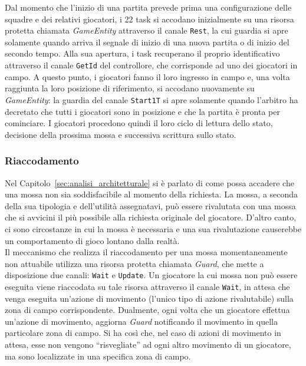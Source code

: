 Dal momento che l'inizio di una partita prevede prima una configurazione delle squadre e dei relativi giocatori, i 22 task si accodano inizialmente su una risorsa protetta chiamata \emph{GameEntity} attraverso il canale \verb+Rest+, la cui guardia si apre solamente quando arriva il segnale di inizio di una nuova partita o di inizio del secondo tempo. Alla sua apertura, i task recuperano il proprio identificativo attraverso il canale \verb+GetId+ del controllore, che corrisponde ad uno dei giocatori in campo. A questo punto, i giocatori fanno il loro ingresso in campo e, una volta raggiunta la loro posizione di riferimento, si accodano nuovamente su \emph{GameEntity}: la guardia del canale \verb+Start1T+ si apre solamente quando l'arbitro ha decretato che tutti i giocatori sono in posizione e che la partita è pronta per cominciare. I giocatori procedono quindi il loro ciclo di lettura dello stato, decisione della prossima mossa e successiva scrittura sullo stato.\\

\subsubsection{Riaccodamento}
\label{sec:implementazione_concorrenza_riaccodamento}

Nel Capitolo~\ref{sec:analisi_architetturale} si è parlato di come possa accadere che una mossa non sia soddisfacibile al momento della richiesta. La mossa, a seconda della sua tipologia e dell'utilità assegnatavi, può essere rivalutata con una mossa che si avvicini il più possibile alla richiesta originale del giocatore. D'altro canto, ci sono circostanze in cui la mossa è necessaria e una sua rivalutazione causerebbe un comportamento di gioco lontano dalla realtà.\\

Il meccanismo che realizza il riaccodamento per una mossa momentaneamente non attuabile utilizza una risorsa protetta chiamata \emph{Guard}, che mette a disposizione due canali: \verb+Wait+ e \verb+Update+. Un giocatore la cui mossa non può essere eseguita viene riaccodata su tale risorsa attraverso il canale \verb+Wait+, in attesa che venga eseguita un'azione di movimento (l'unico tipo di azione rivalutabile) sulla zona di campo corrispondente. Dualmente, ogni volta che un giocatore effettua un'azione di movimento, aggiorna \emph{Guard} notificando il movimento in quella particolare zona di campo. Si ha così che, nel caso di azioni di movimento in attesa, esse non vengono ``risvegliate'' ad ogni altro movimento di un giocatore, ma sono localizzate in una specifica zona di campo.\\

